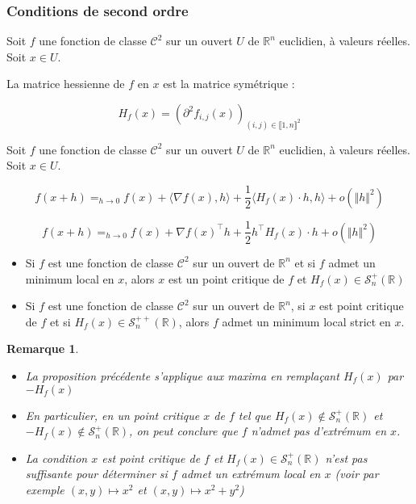 \documentclass[a4paper,12pt]{book}
\newcommand{\Def}[2]{\begin{tcolorbox}[sharp corners, colback=white,colframe=blue!90!black!75, title=Définition : #1]#2\end{tcolorbox}}
\newcommand{\Prop}[2]{\begin{tcolorbox}[sharp corners, colback=white,colframe=red!90!black!75, title=Proposition : #1]#2\end{tcolorbox}}
\newtheorem{Rem}{Remarque}[section]
\def\R{\mathbb{R}}
\begin{document}
\subsubsection{Conditions de second ordre}
\Def{}{Soit $f$ une fonction de classe $\mathcal{C}^2$ sur un ouvert $U$ de $\R^n$ euclidien, à valeurs réelles. Soit $x\in U$.
\par La matrice hessienne de $f$ en $x$ est la matrice symétrique :
\par $$H_f(x) = (\partial^2 f_{i,j}(x))_{(i,j)\in\llbracket1,n\rrbracket^2}$$}
\Prop{Formule de Taylor-Young à l'ordre 2}{Soit $f$ une fonction de classe $\mathcal{C}^2$ sur un ouvert $U$ de $\R^n$ euclidien, à valeurs réelles. Soit $x\in U$.
\par $$f(x+h)=_{h\to 0} f(x) + \langle \nabla f(x), h\rangle + \frac{1}{2}\langle H_f(x)\cdot h, h\rangle + o(\Vert h\Vert^2)$$
\par $$f(x+h)=_{h\to 0} f(x) + \nabla f(x)^\top h + \frac{1}{2}h^\top H_f(x)\cdot h + o(\Vert h\Vert^2)$$}
\Prop{}{\begin{itemize}
\item Si $f$ est une fonction de classe $\mathcal{C}^2$ sur un ouvert de $\R^n$ et si $f$ admet un minimum local en $x$, alors $x$ est un point critique de $f$ et $H_f(x)\in\mathcal{S}_n^+(\R)$
\item Si $f$ est une fonction de classe $\mathcal{C}^2$ sur un ouvert de $\R^n$, si $x$ est point critique de $f$ et si $H_f(x)\in\mathcal{S}_n^{++}(\R)$, alors $f$ admet un minimum local strict en $x$.
\end{itemize}}
\begin{Rem}
\begin{itemize}
\item La proposition précédente s'applique aux maxima en remplaçant $H_f(x)$ par $-H_f(x)$
\item En particulier, en un point critique $x$ de $f$ tel que $H_f(x)\notin\mathcal{S}_n^+(\R)$ et $-H_f(x)\notin\mathcal{S}_n^+(\R)$, on peut conclure que $f$ n'admet pas d'extrémum en $x$.
\item La condition $x$ est point critique de $f$ et $H_f(x)\in\mathcal{S}_n^+(\R)$ n'est pas suffisante pour déterminer si $f$ admet un extrémum local en $x$ (voir par exemple $(x,y)\mapsto x^2$ et $(x,y)\mapsto x^2+y^2$)
\end{itemize}
\end{Rem}
\end{document}
